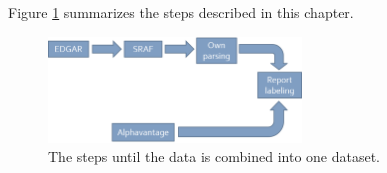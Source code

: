 Figure \ref{figure:data_flowchart} summarizes the steps described in this chapter.
\begin{figure}[h]
    \centering
    \includegraphics[width=0.6\textwidth]{figures/Flowchart_Data.png}
    \caption{The steps until the data is combined into one dataset.}
    \label{figure:data_flowchart}
\end{figure}
